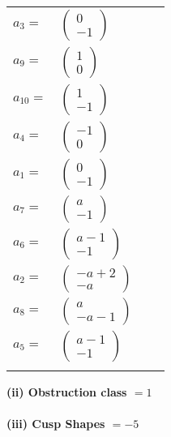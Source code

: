 \documentclass[1p]{elsarticle_modified}
\theoremstyle{definition}
\begin{document}
\begin{tabular}{m{7pt} m{180pt} m{7pt} m{180pt} }
\flushright $a_{3}=$&$\begin{pmatrix}0\\-1\end{pmatrix}$ \\
\flushright $a_{9}=$&$\begin{pmatrix}1\\0\end{pmatrix}$ \\
\flushright $a_{10}=$&$\begin{pmatrix}1\\-1\end{pmatrix}$ \\
\flushright $a_{4}=$&$\begin{pmatrix}-1\\0\end{pmatrix}$ \\
\flushright $a_{1}=$&$\begin{pmatrix}0\\-1\end{pmatrix}$ \\
\flushright $a_{7}=$&$\begin{pmatrix}a\\-1\end{pmatrix}$ \\
\flushright $a_{6}=$&$\begin{pmatrix}a-1\\-1\end{pmatrix}$ \\
\flushright $a_{2}=$&$\begin{pmatrix}- a+2\\- a\end{pmatrix}$ \\
\flushright $a_{8}=$&$\begin{pmatrix}a\\- a-1\end{pmatrix}$ \\
\flushright $a_{5}=$&$\begin{pmatrix}a-1\\-1\end{pmatrix}$\\&\end{tabular}
\flushleft \textbf{(ii) Obstruction class $= 1$}\\~\\
\flushleft \textbf{(iii) Cusp Shapes $= -5$}\\~\\
\end{document}
